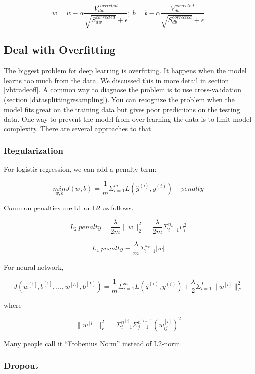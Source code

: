\documentclass[
  12pt,
]{krantz}
\begin{document}
\[w=w-\alpha \frac{V_{dw}^{corrected}}{\sqrt{S_{dw}^{corrected}} +\epsilon};\ b=b-\alpha\frac{V_{db}^{corrected}}{\sqrt{S_{db}^{corrected}}+\epsilon}\]

\hypertarget{deal-with-overfitting}{%
\subsection{Deal with Overfitting}\label{deal-with-overfitting}}

The biggest problem for deep learning is overfitting. It happens when the model learns too much from the data. We discussed this in more detail in section \ref{vbtradeoff}. A common way to diagnose the problem is to use cross-validation (section \ref{datasplittingresampling}). You can recognize the problem when the model fits great on the training data but gives poor predictions on the testing data. One way to prevent the model from over learning the data is to limit model complexity. There are several approaches to that.

\hypertarget{regularization}{%
\subsubsection{Regularization}\label{regularization}}

For logistic regression, we can add a penalty term:

\[\underset{w,b}{min}J(w,b)= \frac{1}{m} \Sigma_{i=1}^{m}L(\hat{y}^{(i)}, y^{(i)}) + penalty\]

Common penalties are L1 or L2 as follows:

\[L_2\ penalty=\frac{\lambda}{2m}\parallel w \parallel_2^2 = \frac{\lambda}{2m}\Sigma_{i=1}^{n_x}w_i^2\]

\[L_1\ penalty = \frac{\lambda}{m}\Sigma_{i=1}^{n_x}|w|\]

For neural network,

\[J(w^{[1]},b^{[1]},\dots,w^{[L]},b^{[L]})=\frac{1}{m}\Sigma_{i=1}^{m}L(\hat{y}^{(i)},y^{(i)}) + \frac{\lambda}{2}\Sigma_{l=1}^{L} \parallel w^{[l]} \parallel^2_F\]

where

\[\parallel w^{[l]} \parallel^2_F = \Sigma_{i=1}^{n^{[l]}}\Sigma_{j=1}^{n^{[l-1]}} (w^{[l]}_{ij})^2\]

Many people call it ``Frobenius Norm'' instead of L2-norm.

\hypertarget{dropout}{%
\subsubsection{Dropout}\label{dropout}}
\end{document}
